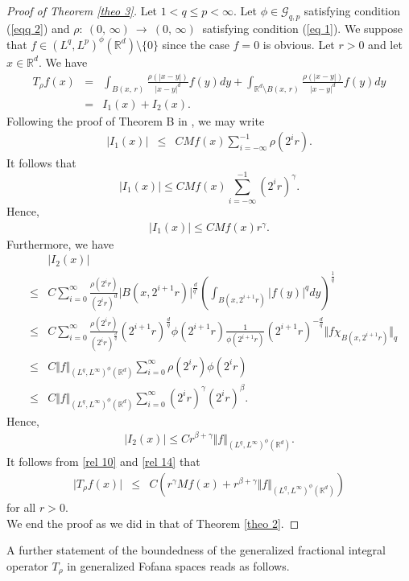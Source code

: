 \documentclass[10pt,a4paper]{amsart}
\numberwithin{equation}{section}
\numberwithin{equation}{section}
\begin{document}
\begin{proof}[Proof of Theorem \ref{theo 3}]
Let $1 < q\leq p < \infty$. Let $\phi\in \mathcal{G}_{q,p}$ satisfying condition (\ref{eqq 2}) and $\rho : \: (0,\,\infty) \:  \to \: (0,\,\infty) \:$ satisfying condition (\ref{eq 1}). We suppose that $f \in (L^{q},L^{p})^{\phi}(\mathbb{R}^{d})\setminus \{ 0 \}$ since the case $f=0$ is obvious. Let $r>0$ and let $x \in \mathbb{R}^{d}$. We have
\begin{eqnarray*}
T_{\rho} f(x)&=&\displaystyle\int_{B(x,\, r)}\frac{\rho(\left|x-y\right|)}{\left|x-y\right|^{d}}f(y)dy+\displaystyle\int_{\mathbb{R}^{d}\setminus B(x,\, r)}\frac{\rho(\left|x-y\right|)}{\left|x-y\right|^{d}}f(y)dy \\ &=& I_{1}(x) + I_{2}(x) . 
\end{eqnarray*}
Following the proof of Theorem B in \cite{GE0}, we may write
\begin{eqnarray*} 
 \vert I_{1}(x) \vert & \leq &  C M f(x) \sum\limits^{-1}_{i=-\infty}  \rho(2^{i}r).
\end{eqnarray*}
It follows that $$\vert I_{1}(x) \vert  \leq  C M f(x) \sum\limits^{-1}_{i=-\infty}  (2^{i}r)^{\gamma}. $$ 
Hence, \begin{eqnarray} \label{rel 10}
\vert I_{1}(x) \vert  \leq C   M f(x)r^{\gamma}.
\end{eqnarray}
Furthermore, we have
\begin{eqnarray*}
& &\vert I_{2}(x) \vert  \\
& \leq & C\sum\limits^{\infty}_{i=0}\frac{\rho(2^{i}r)}{(2^{i}r)^{d}} \vert B(x,2^{i+1}r) \vert^{\frac{d}{q'}} \left( \displaystyle\int_{B(x,2^{i+1}r)} \vert f(y)\vert^{q} dy\right)^{\frac{1}{q}}\\
 &\leq & C \sum\limits^{\infty}_{i=0}\frac{\rho(2^{i}r)}{(2^{i}r)^{\frac{d}{q}}} (2^{i+1}r)^{\frac{d}{q}} \phi(2^{i+1}r)\frac{1}{\phi(2^{i+1}r)}(2^{i+1}r)^{-\frac{d}{q}} \Vert f \chi_{B(x,2^{i+1}r)}   \Vert_{q} \\
 &\leq & C \Vert f \Vert_{(L^{q},L^{\infty})^{\phi}(\mathbb{R}^{d})}\sum\limits^{\infty}_{i=0} \rho(2^{i}r) \phi(2^{i}r)\\&\leq & C \Vert f \Vert_{(L^{q},L^{\infty})^{\phi}(\mathbb{R}^{d})}\sum\limits^{\infty}_{i=0} (2^{i}r)^{\gamma} (2^{i}r)^{\beta}.
\end{eqnarray*}
Hence,
\begin{eqnarray}\label{rel 14}
\vert I_{2}(x) \vert \leq C r^{\beta +\gamma}\Vert f \Vert_{(L^{q},L^{\infty})^{\phi}(\mathbb{R}^{d})}.
\end{eqnarray}
It follows from \eqref{rel 10} and \eqref{rel 14} that
\begin{eqnarray*}
\vert T_{\rho} f(x) \vert &\leq& C\left(r^{\gamma} M f(x)+r^{\beta +\gamma}\Vert f \Vert_{(L^{q},L^{\infty})^{\phi}(\mathbb{R}^{d})}\right)
\end{eqnarray*}
for all $ r > 0 $. \\ 
We end the proof as we did in that of Theorem \ref{theo 2}.
\end{proof}
A further statement of the boundedness of the generalized fractional integral operator $T_{\rho}$ in generalized Fofana spaces reads as follows.
\end{document}

